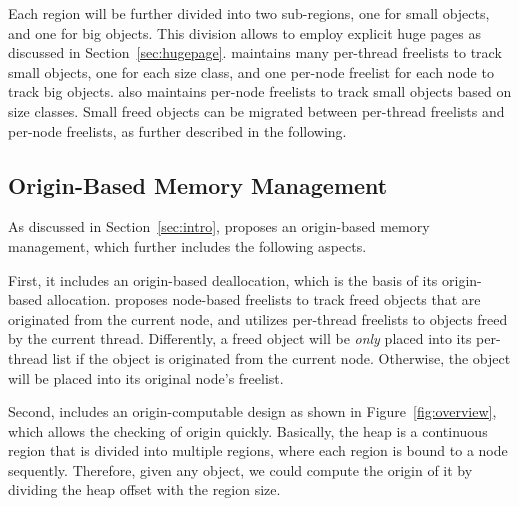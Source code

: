 Each region will be further divided into two sub-regions, one for small objects, and one for big objects. This division allows \NM{} to employ explicit huge pages as discussed in Section~\ref{sec:hugepage}. \NM{} maintains many per-thread freelists to track small objects, one for each size class, and one per-node freelist for each node to track big objects.  \NM{} also maintains per-node freelists to track small objects based on size classes. Small freed objects can be migrated between per-thread freelists and per-node freelists, as further described in the following. 

\subsection{Origin-Based Memory Management} 
\label{sec:taskassign}

As discussed in Section~\ref{sec:intro}, \NM{} proposes an origin-based memory management, which further includes the following aspects. 

First, it includes an origin-based deallocation, which is the basis of its origin-based allocation. \NM{} proposes node-based freelists to track freed objects that are originated from the current node, and utilizes per-thread freelists to objects freed by the current thread. Differently, a freed object will be \textit{only} placed into its per-thread list if the object is originated from the current node. Otherwise, the object will be placed into its original node's freelist.  

Second, \NM{} includes an origin-computable design as shown in Figure~\ref{fig:overview}, which allows the checking of origin quickly. Basically, the heap is a continuous region that is divided into multiple regions, where each region is bound to a node sequently. Therefore, given any object, we could compute the origin of it by dividing the heap offset with the region size. 

